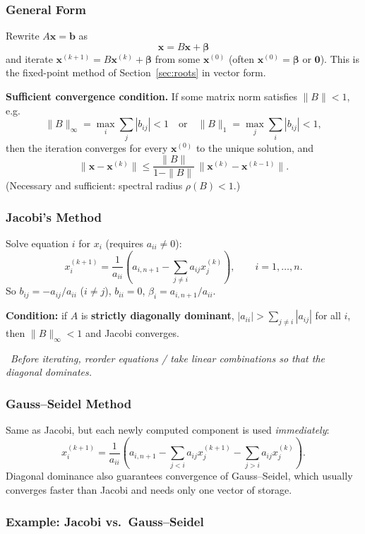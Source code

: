 \documentclass[hidelinks]{article}
\newcommand{\callout}[1]{\par\smallskip\noindent{\color{capri}$\blacktriangleright$}\ \textit{#1}\par\smallskip}
\newcommand{\abs}[1]{\left|#1\right|}
\begin{document}
\subsubsection{General Form}

Rewrite $A\mathbf x=\mathbf b$ as
\[
\mathbf x=B\mathbf x+\boldsymbol\beta
\]
and iterate $\mathbf x^{(k+1)}=B\mathbf x^{(k)}+\boldsymbol\beta$ from some $\mathbf x^{(0)}$ (often $\mathbf x^{(0)}=\boldsymbol\beta$ or $\mathbf 0$). This is the fixed-point method of Section~\ref{sec:roots} in vector form.

\textbf{Sufficient convergence condition.} If some matrix norm satisfies $\|B\|<1$, e.g.
\[
\|B\|_\infty=\max_i\sum_j\abs{b_{ij}}<1\quad\text{or}\quad\|B\|_1=\max_j\sum_i\abs{b_{ij}}<1,
\]
then the iteration converges for every $\mathbf x^{(0)}$ to the unique solution, and
\[
\|\mathbf x-\mathbf x^{(k)}\|\le\frac{\|B\|}{1-\|B\|}\,\|\mathbf x^{(k)}-\mathbf x^{(k-1)}\| .
\]
(Necessary and sufficient: spectral radius $\rho(B)<1$.)

\subsubsection{Jacobi's Method}

Solve equation $i$ for $x_i$ (requires $a_{ii}\neq0$):
\[
x_i^{(k+1)}=\frac{1}{a_{ii}}\left(a_{i,n+1}-\sum_{j\neq i}a_{ij}x_j^{(k)}\right),\qquad i=1,\dots,n .
\]
So $b_{ij}=-a_{ij}/a_{ii}$ ($i\neq j$), $b_{ii}=0$, $\beta_i=a_{i,n+1}/a_{ii}$.

\textbf{Condition:} if $A$ is \textbf{strictly diagonally dominant}, $\abs{a_{ii}}>\sum_{j\ne i}\abs{a_{ij}}$ for all $i$, then $\|B\|_\infty<1$ and Jacobi converges.

\callout{Before iterating, reorder equations / take linear combinations so that the diagonal dominates.}

\subsubsection{Gauss--Seidel Method}

Same as Jacobi, but each newly computed component is used \emph{immediately}:
\[
x_i^{(k+1)}=\frac{1}{a_{ii}}\left(a_{i,n+1}-\sum_{j<i}a_{ij}x_j^{(k+1)}-\sum_{j>i}a_{ij}x_j^{(k)}\right).
\]
Diagonal dominance also guarantees convergence of Gauss--Seidel, which usually converges faster than Jacobi and needs only one vector of storage.

\subsubsection{Example: Jacobi vs.\ Gauss--Seidel}
\end{document}
